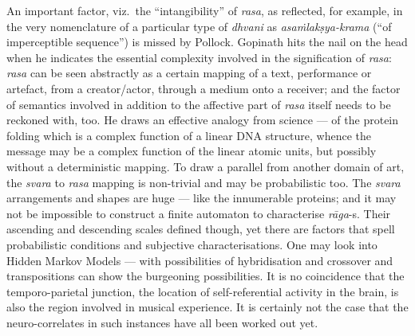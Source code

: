 An important factor, viz.\ the “intangibility” of \textsl{rasa}, as reflected, for example, in the very nomenclature of a particular type of \textsl{dhvani} as \textsl{asaṁlakṣya-krama} (“of imperceptible sequence”) is missed by Pollock. Gopinath hits the nail on the head when he indicates the essential complexity involved in the signification of \textsl{rasa}: \textsl{rasa} can be seen abstractly as a certain mapping of a text, performance or artefact, from a creator/actor, through a medium onto a receiver; and the factor of semantics involved in addition to the affective part of \textsl{rasa} itself needs to be reckoned with, too. He draws an effective analogy from science --- of the protein folding which is a complex function of a linear DNA structure, whence the message may be a complex function of the linear atomic units, but possibly without a deterministic mapping. To draw a parallel from another domain of art, the \textsl{svara} to \textsl{rasa} mapping is non-trivial and may be probabilistic too. The \textsl{svara} arrangements and shapes are huge --- like the innumerable proteins; and it may not be impossible to construct a finite automaton to characterise \textsl{rāga}-s. Their ascending and descending scales defined though, yet there are factors that spell probabilistic conditions and subjective characterisations. One may look into Hidden Markov Models --- with possibilities of hybridisation and crossover and transpositions can show the burgeoning possibilities. It is no coincidence that the temporo-parietal junction, the location of self-referential activity in the brain, is also the region involved in musical experience. It is certainly not the case that the neuro-correlates in such instances have all been worked out yet.


